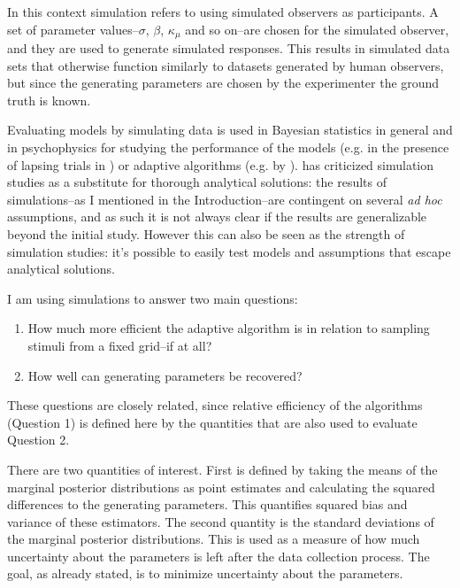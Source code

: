 \documentclass{article}\usepackage{knitr}
\begin{document}
In this context simulation refers to using simulated observers as participants. A set of parameter values--$\sigma$, $\beta$, $\kappa_{\mu}$ and so on--are chosen for the simulated observer, and they are used to generate simulated responses. This results in simulated data sets that otherwise function similarly to datasets generated by human observers, but since the generating parameters are chosen by the experimenter the ground truth is known. 

Evaluating models by simulating data is used in Bayesian statistics in general \citep[Chapter 10]{bda} and in psychophysics for studying the performance of the models (e.g. in the presence of lapsing trials in \citet{prins2012}) or adaptive algorithms (e.g. by \citet{kontsevichtyler1999}). \citet{oron2007} has criticized simulation studies as a substitute for thorough analytical solutions: the results of simulations--as I mentioned in the Introduction--are contingent on several \textit{ad hoc} assumptions, and as such it is not always clear if the results are generalizable beyond the initial study. However this can also be seen as the strength of simulation studies: it's possible to easily test models and assumptions that escape analytical solutions.

I am using simulations to answer  two main questions: 

\begin{enumerate}
  \item How much more efficient the adaptive algorithm is in relation to sampling stimuli from a fixed grid--if at all? 
  \item How well can generating parameters be recovered?
\end{enumerate}

These questions are closely related, since relative efficiency of the algorithms (Question 1) is defined here by the quantities that are also used to evaluate Question 2. 

There are two quantities of interest. First is defined by taking the means of the marginal posterior distributions as point estimates and calculating the squared differences to the generating parameters. This quantifies squared bias and variance of these estimators. The second quantity is the standard deviations of the marginal posterior distributions. This is used as a measure of how much uncertainty about the parameters is left after the data collection process. The goal, as already stated, is to minimize uncertainty about the parameters.
\end{document}

